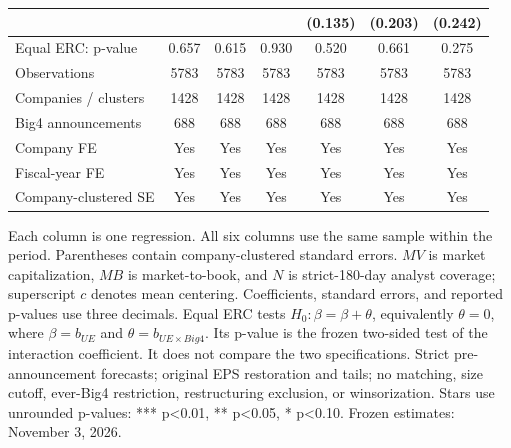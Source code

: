\documentclass[10pt]{article}
\begin{document}
\begin{tabular*}{\textwidth}{@{\extracolsep{\fill}}lcccccc@{}}
 &  &  &  & (0.135) & (0.203) & (0.242) \\
\midrule
Equal ERC: p-value & 0.657 & 0.615 & 0.930 & 0.520 & 0.661 & 0.275 \\
Observations & 5783 & 5783 & 5783 & 5783 & 5783 & 5783 \\
Companies / clusters & 1428 & 1428 & 1428 & 1428 & 1428 & 1428 \\
Big4 announcements & 688 & 688 & 688 & 688 & 688 & 688 \\
Company FE & Yes & Yes & Yes & Yes & Yes & Yes \\
Fiscal-year FE & Yes & Yes & Yes & Yes & Yes & Yes \\
Company-clustered SE & Yes & Yes & Yes & Yes & Yes & Yes \\
\bottomrule\end{tabular*}\par\medskip
\noindent\footnotesize Each column is one regression. All six columns use the same sample within the period. Parentheses contain company-clustered standard errors. \(MV\) is market capitalization, \(MB\) is market-to-book, and \(N\) is strict-180-day analyst coverage; superscript \(c\) denotes mean centering. Coefficients, standard errors, and reported p-values use three decimals. Equal ERC tests \(H_0:\beta=\beta+\theta\), equivalently \(\theta=0\), where \(\beta=b_{UE}\) and \(\theta=b_{UE\times Big4}\). Its p-value is the frozen two-sided test of the interaction coefficient. It does not compare the two specifications. Strict pre-announcement forecasts; original EPS restoration and tails; no matching, size cutoff, ever-Big4 restriction, restructuring exclusion, or winsorization. Stars use unrounded p-values: *** p<0.01, ** p<0.05, * p<0.10. Frozen estimates: November 3, 2026.
\end{document}
